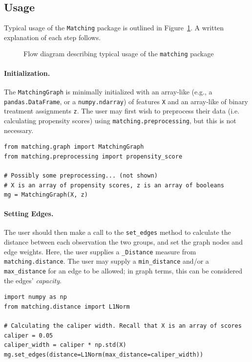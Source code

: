 \documentclass[11pt]{extarticle}
\begin{document}
\newpage
\subsection{Usage}
\label{subsec:usage}

Typical usage of the \texttt{Matching} package is outlined in Figure~\ref{fig:matching_usage}. A written explanation of each step follows.

\begin{figure}[h!]
  \caption{\label{fig:matching_usage} Flow diagram describing typical usage of the \texttt{matching} package}
\end{figure}

\paragraph{Initialization.} 
The \texttt{MatchingGraph} is minimally initialized with an array-like (e.g., a \texttt{pandas.DataFrame}, or a \texttt{numpy.ndarray}) of features \texttt{X} and an array-like of binary treatment assignments \texttt{z}. The user may first wish to preprocess their data (i.e. calculating propensity scores) using \texttt{matching.preprocessing}, but this is not necessary.
\begin{verbatim}
from matching.graph import MatchingGraph
from matching.preprocessing import propensity_score

# Possibly some preprocessing... (not shown)
# X is an array of propensity scores, z is an array of booleans
mg = MatchingGraph(X, z)
\end{verbatim}
\paragraph{Setting Edges.} The user should then make a call to the \texttt{set\_edges} method to calculate the distance between each observation the two groups, and set the graph nodes and edge weights. Here, the user supplies a \texttt{\_Distance} measure from \texttt{matching.distance}. The user may supply a \texttt{min\_distance} and/or a \texttt{max\_distance} for an edge to be allowed; in graph terms, this can be considered the edges' \emph{capacity}.
\begin{verbatim}
import numpy as np
from matching.distance import L1Norm

# Calculating the caliper width. Recall that X is an array of scores
caliper = 0.05
caliper_width = caliper * np.std(X)
mg.set_edges(distance=L1Norm(max_distance=caliper_width))
\end{verbatim}
\end{document}
